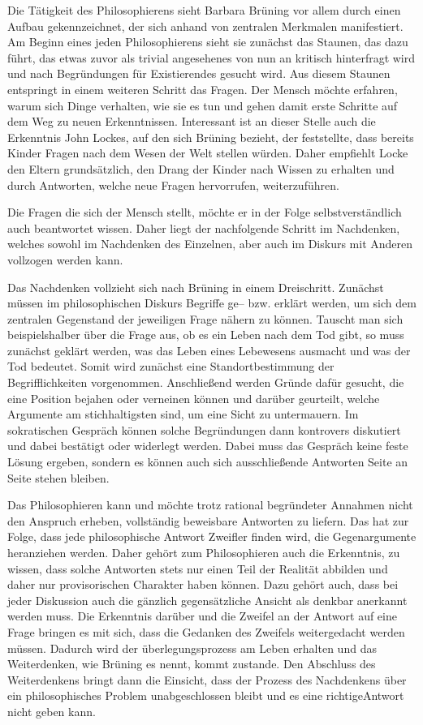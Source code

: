 Die Tätigkeit des Philosophierens sieht Barbara Brüning vor allem durch einen Aufbau gekennzeichnet, der sich anhand von zentralen Merkmalen manifestiert. 
Am Beginn eines jeden Philosophierens sieht sie zunächst das Staunen, das dazu führt, das etwas zuvor als trivial angesehenes von nun an kritisch hinterfragt wird und nach Begründungen für Existierendes gesucht wird. 
Aus diesem Staunen entspringt in einem weiteren Schritt das Fragen. 
Der Mensch möchte erfahren, warum sich Dinge verhalten, wie sie es tun und gehen damit \glqq erste Schritte auf dem Weg zu neuen Erkenntnissen\grqq{}\cite{BB10, S.10}. 
Interessant ist an dieser Stelle auch die Erkenntnis John Lockes, auf den sich Brüning bezieht, der feststellte, dass bereits Kinder Fragen nach dem Wesen der Welt stellen würden. 
Daher empfiehlt Locke den Eltern grundsätzlich, den Drang der Kinder nach Wissen zu erhalten und durch Antworten, welche neue Fragen hervorrufen, weiterzuführen.

Die Fragen die sich der Mensch stellt, möchte er in der Folge selbstverständlich auch beantwortet wissen. 
Daher liegt der nachfolgende Schritt im Nachdenken, welches sowohl im Nachdenken des Einzelnen, aber auch im Diskurs mit Anderen vollzogen werden kann. 

Das Nachdenken vollzieht sich nach Brüning in einem Dreischritt. 
Zunächst müssen im philosophischen Diskurs Begriffe ge-- bzw. erklärt werden, um sich dem zentralen Gegenstand der jeweiligen Frage nähern zu können. 
Tauscht man sich beispielshalber über die Frage aus, ob es ein Leben nach dem Tod gibt, so muss zunächst geklärt werden, was das Leben eines Lebewesens ausmacht und was der Tod bedeutet. 
Somit wird zunächst eine Standortbestimmung der Begrifflichkeiten vorgenommen. 
Anschließend werden Gründe dafür gesucht, die eine Position bejahen oder verneinen können und darüber geurteilt, welche Argumente am stichhaltigsten sind, um eine Sicht zu untermauern. 
Im sokratischen Gespräch können solche Begründungen dann kontrovers diskutiert und dabei bestätigt oder widerlegt werden. 
Dabei muss das Gespräch keine feste Lösung ergeben, sondern es können auch sich ausschließende Antworten Seite an Seite stehen bleiben\cite{BB10, S.11}.

Das Philosophieren kann und möchte trotz rational begründeter Annahmen nicht den Anspruch erheben, vollständig beweisbare Antworten zu liefern. 
Das hat zur Folge, dass jede philosophische Antwort Zweifler finden wird, die Gegenargumente heranziehen werden. 
Daher gehört zum Philosophieren auch die Erkenntnis, zu wissen, dass solche Antworten stets nur einen Teil der Realität abbilden und daher nur provisorischen Charakter haben können. 
Dazu gehört auch, dass bei jeder Diskussion auch die gänzlich gegensätzliche Ansicht als denkbar anerkannt werden muss. 
Die Erkenntnis darüber und die Zweifel an der Antwort auf eine Frage bringen es mit sich, dass die Gedanken des Zweifels weitergedacht werden müssen. 
Dadurch wird der überlegungsprozess am Leben erhalten und das Weiterdenken, wie Brüning es nennt, kommt zustande. 
Den Abschluss des Weiterdenkens bringt dann die Einsicht, \glqq dass der Prozess des Nachdenkens über ein philosophisches Problem unabgeschlossen bleibt\grqq{}\cite{BB10, S.13} und es eine \glqq richtige\grqq Antwort nicht geben kann.

